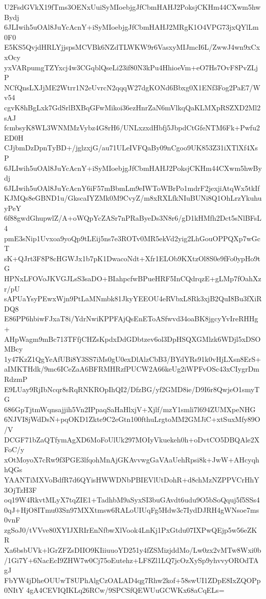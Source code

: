 U2FsdGVkX19fTms3OENxUuiSyMIoebjgJfCbmHAHJ2PoksjCKHm44CXwm5hwBydj
6JLIwih5uOAl8JuYcAcnY+iSyMIoebjgJfCbmHAHJ2MRgK1O4VPG73jxQYlLm0F0
E5KS5QvjdHRLYjjspsMCVBk6NZdTLWKW9r6VasxyMIJmcI6L/ZwwJ4wn9xCxxOcy
yxVARpumgTZYxcj4w3CGqblQseLi23if80N3kPu4HhioeVm+eO7Hs7OvF8PvZLjP
NCfQnsLXJjME2Wtrr1N2eUvrcN2qqqW27dgKONd6Bbxg0X1ENf3Fog2PaE7/Wv54
cgvK8hBgLxk7GdSrlBXBqGFwMikoi36ezHnrZaN6mVlkqQaKLMXpRSZXD2Ml2sAJ
fcmbsyK8WL3WNMMzVybz4G8rH6/UNLxzxdHbfj5JbpdCtGfeNTM6Fk+Pwfu2ED0H
CJjbmDzDpnTyBD+/jglzxjG/au71ULeIVFQaBy09nCgoo9UK853Z31iXTlXf4XsP
6JLIwih5uOAl8JuYcAcnY+iSyMIoebjgJfCbmHAHJ2PoksjCKHm44CXwm5hwBydj
6JLIwih5uOAl8JuYcAcnY6iF57mBbmLm9eIWToWBrPo1mdrF2jexjiAtqWx5tkIf
KJMQs8eGBND1u/GkscaIYZMk0M9CvyZ/m8xRXLfkNIuBUNi8Q1OhLrzYkuhuyPeY
6f88gwdGhupwlZ/A+oWQpYcZASr7nPRaByeDs3N8r6/gD1kHMfh2Dct5sNlBFsL4
pmE3sNip1Uvxoa9yoQp9tLEij5ns7e3ROTv0MR5ekVd2yig2LhGouOPPQXp7wGcT
sK+QJrt3F8P8cHGWJx1b7pK1DwacoNdt+Xfr1ELOb9KXtzOl8S0e9fFo0ypHo9tG
HPNxLFOVoJKVGJLsS3saDO+BIahpcfwBPueHRF5InCQdrqzE+gLMp7fOahXzr/pU
sAPUaYsyPEwxWjn9PtLaMNmbk81JkyYEEOU4eRVbxL8Rk3xjB2QuI8Bu3fXiRDQ8
E86PP6hbiwFJxaT8i/YdrNwiKPPFAjQsEnEToASfwvd34oaBK8jgcyYvIreRHHg+
AHpWagm9mBc713TFfjCHZsKpdxDdGDbtzev6ol3DpHSQXGMlzk6WDjl5xDSOMBcy
1y47KzZ1QgYeAfUBi8Y3SS7iMs0gU0exDlAlzCbB3/BYdYRs91k0vHjLXsn8ErS+
aIMKTHdk/9mc6ICeZaA6BFRMHRzfPUCW2A66keUg2iWPFvOSc43xCIygrDmRdzmP
E9LUay9RjIbNcqr8sRqRNKROpIhQI2/DfzBG/yf2GMD8ie/D9I6r8QwjeO1smyTG
686GpTjtmWqnsajjih5Vn2IPpaqSaHaHlxjV+Xjlf/mzY1smli7l694ZUMXpeNHG
6NJVI8jWdDsN+pqOKD1Zkte9C2eGtn100fthuLrgtoMM2GMJiC+xtSuxMfy89O/V
DCGF71bZaQTfymAgXD6MoFoUlUk297MOIyVkuekeh0h+oDvtCO5DBQAle2XFoC/y
xOtMoyoX7cRw9f3PGE3lfqohMnAjGKAvvwgGaVAaUehRpsi8k+JwW+AHcyqhhQGs
YAANTiMXVoBdfR7d6QYisHWWDNbPBIEVlUtDohR+d8chMzNZPPVCrHhY3OjTzH3F
oq19W4RkvtMLyX7tqZIE1+TadhbM9aSyxSI3buGAvdt6udu9O5bSoQquj5f5SSs4
0qJ+HjO8ITmu03Sn97MXXtmsw6RALoUIUqFg5Hdw3c7IydDJRH4gWNsoe7ms0vnF
zgSoJ0/tVVve80XYIJXRIrEnNfbwXlVook4LnKj1PxGtdu07IXPwQEjp5w56eZKR
Xa6bsbUVk+lGrZFZsDIIO9KIiiuuoYD251y4fZSMizjddMo/Lw0zx2vMTw8Wxi0b
/1Gi7Y+6NacEcI9ZHW7w0Cj75oEutehz+LF8Zl1LQ7jcOzXySp9yhvvyOROdTAgJ
FbYW4jDheOUUwT8UPhAlgCzOALAD4qg7Rhw2kof+58swUI1ZDpE8IxZQOPp0NItY
4gA4CEVIQIKLq26RCw/9SPCSfQEWUuGCWKx68aCqELs=
